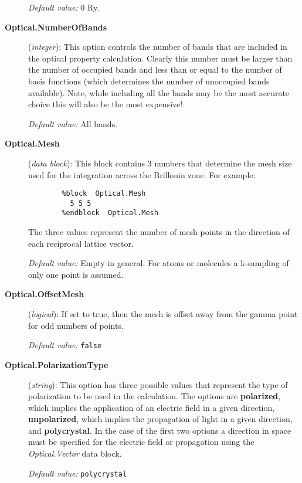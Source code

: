 \documentclass[11pt]{article}
\begin{document}
\begin{description}
{\it Default value:} 0 Ry.

\item[{\bf Optical.NumberOfBands}] ({\it integer}):
This option controls the number of bands that are included in
the optical property calculation. Clearly this number must be
larger than the number of occupied bands and less than or
equal to the number of basis functions (which determines the
number of unoccupied bands available). Note, while including
all the bands may be the most accurate choice this will also
be the most expensive!

{\it Default value:} All bands.

\item[{\bf Optical.Mesh}] ({\it data block}):
This block contains 3 numbers that determine the mesh size
used for the integration across the Brillouin zone. For
example:

\begin{verbatim}
        %block  Optical.Mesh
          5 5 5
        %endblock  Optical.Mesh
\end{verbatim}

The three values represent the number of mesh points in
the direction of each reciprocal lattice vector.

{\it Default value:} Empty in general. For atoms 
or molecules a k-sampling of only one point is assumed.

\item[{\bf Optical.OffsetMesh}] ({\it logical}):
If set to true, then the mesh is offset away from the
gamma point for odd numbers of points.

{\it Default value:} {\tt false}

\item[{\bf Optical.PolarizationType}] ({\it string}):
This option has three possible values that represent the
type of polarization to be used in the calculation. The options
are {\bf polarized}, which implies the application of an electric
field in a given direction, {\bf unpolarized}, which implies the
propagation of light in a given direction, and {\bf polycrystal}.
In the case of the first two options a direction in space must
be specified for the electric field or propagation using the
{\it Optical.Vector} data block.

{\it Default value:} {\tt polycrystal}


\end{description}
\end{document}
